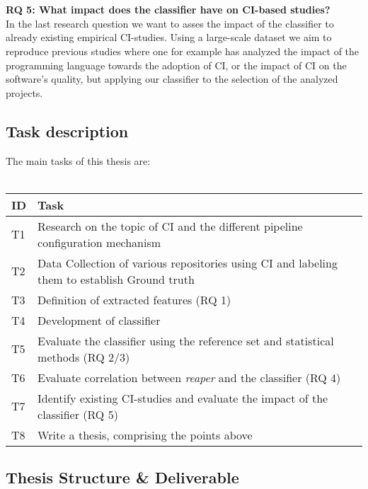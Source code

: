 \documentclass{task_description}
\begin{document}
\\\\
\textbf{RQ 5: What impact does the classifier have on CI-based studies?}\\
In the last research question we want to asses the impact of the classifier to already existing empirical CI-studies. Using a large-scale dataset we aim to reproduce previous studies where one for example has analyzed the impact of the programming language towards the adoption of CI, or the impact of CI on the software's quality, but applying our classifier to the selection of the analyzed projects. 
\newpage
\subsection*{Task description}

The main tasks of this thesis are:
\\\\
\bgroup
\def\arraystretch{1.1}%
\begin{tabular}{lp{10cm}}  
 ID & Task \\
\hline\noalign{\smallskip}
 T1 & Research on the topic of CI and the different pipeline configuration mechanism \\
 T2 & Data Collection of various repositories using CI and labeling them to establish Ground truth \\
 T3 & Definition of extracted features (RQ 1)\\
 T4 & Development of classifier\\
 T5 & Evaluate the classifier using the reference set and statistical methods (RQ 2/3)\\
 T6 & Evaluate correlation between \textit{reaper} and the classifier (RQ 4)\\
 T7 & Identify existing CI-studies and evaluate the impact of the classifier (RQ 5)\\
 T8 & Write a thesis, comprising the points above\\
\hline
\end{tabular}
\egroup

\subsection*{Thesis Structure \& Deliverable}
\end{document}
